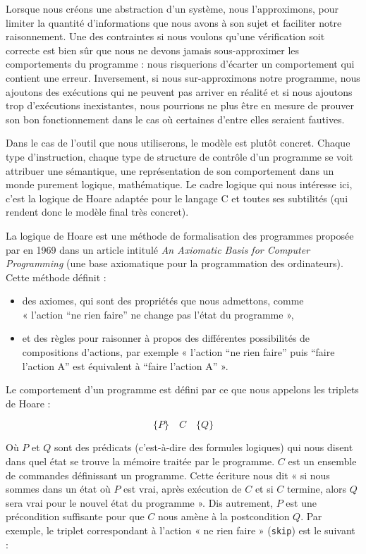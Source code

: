 Lorsque nous créons une abstraction d'un système, nous l'approximons, pour limiter
la quantité d'informations que nous avons à son sujet et faciliter notre
raisonnement. Une des contraintes si nous voulons qu'une vérification soit
correcte est bien sûr que nous ne devons jamais sous-approximer les comportements
du programme : nous risquerions d'écarter un comportement qui contient une erreur.
Inversement, si nous sur-approximons notre programme, nous ajoutons des exécutions
qui ne peuvent pas arriver en réalité et si nous ajoutons trop d'exécutions
inexistantes, nous pourrions ne plus être en mesure de prouver son bon
fonctionnement dans le cas où certaines d'entre elles seraient fautives.



Dans le cas de l'outil que nous utiliserons, le modèle est plutôt concret.
Chaque type d'instruction, chaque type de structure de contrôle d'un programme
se voit attribuer une sémantique, une représentation de son comportement dans
un monde purement logique, mathématique. Le cadre logique qui nous intéresse
ici, c'est la logique de Hoare adaptée pour le langage C et toutes ses
subtilités (qui rendent donc le modèle final très concret).




La logique de Hoare est une méthode de formalisation des programmes proposée
par 
en 1969 dans un article intitulé \textit{An Axiomatic Basis for
Computer Programming} (une base axiomatique pour la programmation des
ordinateurs). Cette méthode définit :
\begin{itemize}
\item des axiomes, qui sont des propriétés que nous admettons, comme \\
« l'action “ne rien faire” ne change pas l'état du programme »,
\item et des règles pour raisonner à propos des différentes possibilités de
compositions d'actions, par exemple « l'action “ne rien faire” puis “faire
l'action A” est équivalent à “faire l'action A” ».
\end{itemize}


Le comportement d'un programme est défini par ce que nous appelons les triplets
de Hoare :



$$\{P\} \quad C \quad \{Q\}$$



Où $P$ et $Q$ sont des prédicats (c'est-à-dire des formules logiques) qui nous disent dans
quel état se trouve la mémoire traitée par le programme. $C$ est un ensemble de
commandes définissant un programme. Cette écriture nous dit « si nous sommes
dans un état où $P$ est vrai, après exécution de $C$ et si $C$ termine,
alors $Q$ sera vrai pour le nouvel état du programme ». Dis autrement, $P$ est
une précondition suffisante pour que $C$ nous amène à la postcondition $Q$.
Par exemple, le triplet correspondant à l'action « ne rien faire »
(\texttt{skip}) est le suivant :




